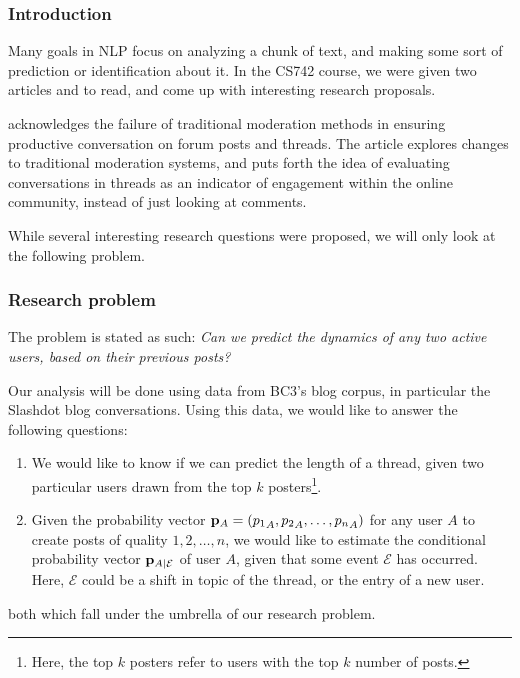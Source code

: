 \documentclass[a4paper,12pt]{article}
\numberwithin{equation}{section}
\begin{document}
 

\subsubsection*{Introduction}

Many goals in NLP focus on analyzing a chunk of text, and making some sort of prediction or identification about it. In the CS742 course, we were given two articles \cite{dejareview} and \cite{anae} to read, and come up with interesting research proposals. 

\cite{anae} acknowledges the failure of traditional moderation methods in ensuring productive conversation on forum posts and threads. The article explores changes to traditional moderation systems, and puts forth the idea of evaluating conversations in threads as an indicator of engagement within the online community, instead of just looking at comments.

While several interesting research questions were proposed, we will only look at the following problem.

\subsubsection*{Research problem}

The problem is stated as such: {\it Can we predict the dynamics of any two active users, based on their previous posts?}

Our analysis will be done using data from BC3's blog corpus, in particular the Slashdot blog conversations. Using this data, we would like to answer the following questions:
\vspace*{-0.5cm}
\begin{enumerate}
\item We would like to know if we can predict the length of a thread, given two particular users drawn from the top $k$ posters\footnote{Here, the top $k$ posters refer to users with the top $k$ number of posts.}. 
\item Given the probability vector ${\bf p}_A = ({p_1}_A, {p_2}_A,\hdots, {p_n}_A)$ for any user $A$ to create posts of quality $1,2,\hdots, n$, we would like to estimate the conditional probability vector ${\bf p}_{A|\mathcal E}$ of user $A$, given that some event $\mathcal E$ has occurred. Here, $\mathcal E$ could be a shift in topic of the thread, or the entry of a new user.
\end{enumerate}
both which fall under the umbrella of our research problem.
\end{document}
